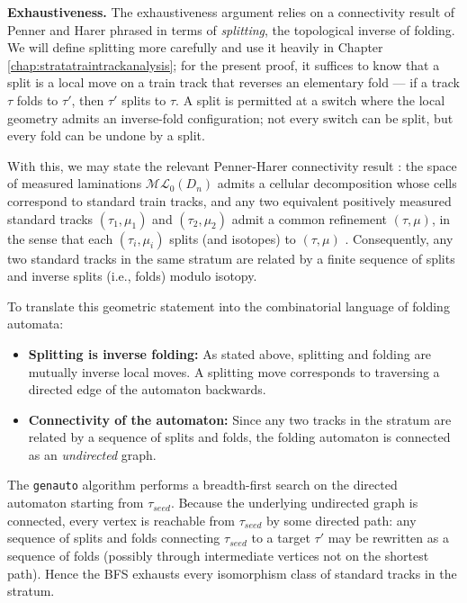 \begin{myproof}
\textbf{Exhaustiveness.}
The exhaustiveness argument relies on a connectivity result of Penner and Harer phrased in terms of \emph{splitting}, the topological inverse of folding. We will define splitting more carefully and use it heavily in Chapter \ref{chap:stratatraintrackanalysis}; for the present proof, it suffices to know that a split is a local move on a train track that reverses an elementary fold --- if a track $\tau$ folds to $\tau'$, then $\tau'$ splits to $\tau$. A split is permitted at a switch where the local geometry admits an inverse-fold configuration; not every switch can be split, but every fold can be undone by a split.

With this, we may state the relevant Penner-Harer connectivity result \cite{penner1992combinatorics}: the space of measured laminations $\mathcal{ML}_0(D_n)$ admits a cellular decomposition whose cells correspond to standard train tracks, and any two equivalent positively measured standard tracks $(\tau_1, \mu_1)$ and $(\tau_2, \mu_2)$ admit a common refinement $(\tau, \mu)$, in the sense that each $(\tau_i, \mu_i)$ splits (and isotopes) to $(\tau, \mu)$ \cite[Theorem~2.3.1]{penner1992combinatorics}. Consequently, any two standard tracks in the same stratum are related by a finite sequence of splits and inverse splits (i.e., folds) modulo isotopy.

To translate this geometric statement into the combinatorial language of folding automata:
\begin{itemize}
    \item \textbf{Splitting is inverse folding:} As stated above, splitting and folding are mutually inverse local moves. A splitting move corresponds to traversing a directed edge of the automaton backwards.
    \item \textbf{Connectivity of the automaton:} Since any two tracks in the stratum are related by a sequence of splits and folds, the folding automaton is connected as an \emph{undirected} graph.
\end{itemize}

The \texttt{genauto} algorithm performs a breadth-first search on the directed automaton starting from $\tau_{seed}$. Because the underlying undirected graph is connected, every vertex is reachable from $\tau_{seed}$ by some directed path: any sequence of splits and folds connecting $\tau_{seed}$ to a target $\tau'$ may be rewritten as a sequence of folds (possibly through intermediate vertices not on the shortest path). Hence the BFS exhausts every isomorphism class of standard tracks in the stratum.


\end{myproof}
